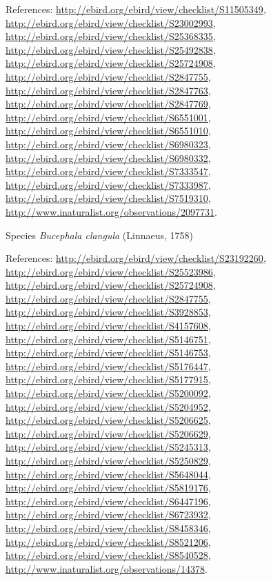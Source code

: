 \documentclass[9pt, article]{memoir}
\begin{document}
\begin{multicols}{2}
\vspace{6pt}References: 
\url{http://ebird.org/ebird/view/checklist/S11505349}, 
\url{http://ebird.org/ebird/view/checklist/S23002993}, 
\url{http://ebird.org/ebird/view/checklist/S25368335}, 
\url{http://ebird.org/ebird/view/checklist/S25492838}, 
\url{http://ebird.org/ebird/view/checklist/S25724908}, 
\url{http://ebird.org/ebird/view/checklist/S2847755}, 
\url{http://ebird.org/ebird/view/checklist/S2847763}, 
\url{http://ebird.org/ebird/view/checklist/S2847769}, 
\url{http://ebird.org/ebird/view/checklist/S6551001}, 
\url{http://ebird.org/ebird/view/checklist/S6551010}, 
\url{http://ebird.org/ebird/view/checklist/S6980323}, 
\url{http://ebird.org/ebird/view/checklist/S6980332}, 
\url{http://ebird.org/ebird/view/checklist/S7333547}, 
\url{http://ebird.org/ebird/view/checklist/S7333987}, 
\url{http://ebird.org/ebird/view/checklist/S7519310}, 
\url{http://www.inaturalist.org/observations/2097731}.

\vspace{6pt}\noindent\hspace{36pt}Species \textit{Bucephala clangula} (Linnaeus, 1758)


\vspace{6pt}References: 
\url{http://ebird.org/ebird/view/checklist/S23192260}, 
\url{http://ebird.org/ebird/view/checklist/S25523986}, 
\url{http://ebird.org/ebird/view/checklist/S25724908}, 
\url{http://ebird.org/ebird/view/checklist/S2847755}, 
\url{http://ebird.org/ebird/view/checklist/S3928853}, 
\url{http://ebird.org/ebird/view/checklist/S4157608}, 
\url{http://ebird.org/ebird/view/checklist/S5146751}, 
\url{http://ebird.org/ebird/view/checklist/S5146753}, 
\url{http://ebird.org/ebird/view/checklist/S5176447}, 
\url{http://ebird.org/ebird/view/checklist/S5177915}, 
\url{http://ebird.org/ebird/view/checklist/S5200092}, 
\url{http://ebird.org/ebird/view/checklist/S5204952}, 
\url{http://ebird.org/ebird/view/checklist/S5206625}, 
\url{http://ebird.org/ebird/view/checklist/S5206629}, 
\url{http://ebird.org/ebird/view/checklist/S5245313}, 
\url{http://ebird.org/ebird/view/checklist/S5250829}, 
\url{http://ebird.org/ebird/view/checklist/S5648044}, 
\url{http://ebird.org/ebird/view/checklist/S5819176}, 
\url{http://ebird.org/ebird/view/checklist/S6447196}, 
\url{http://ebird.org/ebird/view/checklist/S6723932}, 
\url{http://ebird.org/ebird/view/checklist/S8458346}, 
\url{http://ebird.org/ebird/view/checklist/S8521206}, 
\url{http://ebird.org/ebird/view/checklist/S8540528}, 
\url{http://www.inaturalist.org/observations/14378}.


\end{multicols}
\end{document}

